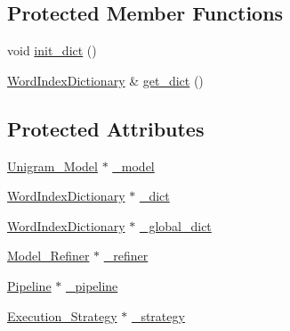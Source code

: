 \subsection*{Protected Member Functions}
\begin{DoxyCompactItemize}
\item 
void \hyperlink{class_unigram___model___streaming___builder_adeef20b390c1f3801a6dfec0b297caee}{init\_\-dict} ()
\item 
\hyperlink{class_word_index_dictionary}{WordIndexDictionary} \& \hyperlink{class_unigram___model___streaming___builder_a5f29e8eaf012c9112c69155cb50a11da}{get\_\-dict} ()
\end{DoxyCompactItemize}
\subsection*{Protected Attributes}
\begin{DoxyCompactItemize}
\item 
\hyperlink{class_unigram___model}{Unigram\_\-Model} $\ast$ \hyperlink{class_unigram___model___streaming___builder_aec55472cf6c9e808387eaecc5db3c285}{\_\-model}
\item 
\hyperlink{class_word_index_dictionary}{WordIndexDictionary} $\ast$ \hyperlink{class_unigram___model___streaming___builder_ac7c2b9038dac10bcd773e0e16d31818b}{\_\-dict}
\item 
\hyperlink{class_word_index_dictionary}{WordIndexDictionary} $\ast$ \hyperlink{class_unigram___model___streaming___builder_acd6b7ee8e92d9e6b6a1fb7dba376050a}{\_\-global\_\-dict}
\item 
\hyperlink{class_model___refiner}{Model\_\-Refiner} $\ast$ \hyperlink{class_unigram___model___streaming___builder_a8ecadb0794c19faa329ec649c3971af7}{\_\-refiner}
\item 
\hyperlink{class_pipeline}{Pipeline} $\ast$ \hyperlink{class_unigram___model___streaming___builder_a92fea933c39e4671079e895ff3d1911e}{\_\-pipeline}
\item 
\hyperlink{class_execution___strategy}{Execution\_\-Strategy} $\ast$ \hyperlink{class_unigram___model___streaming___builder_af5e8797481308aca8fc2b1528fa0fde7}{\_\-strategy}
\end{DoxyCompactItemize}


